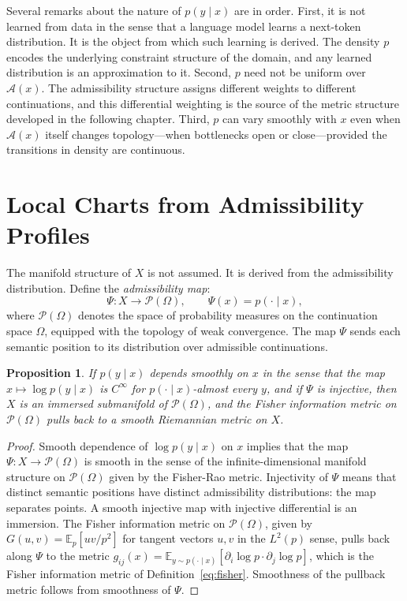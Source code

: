 \documentclass[12pt, oneside]{book}
\theoremstyle{plain-flyxion}
\newtheorem{proposition}[theorem]{Proposition}
\theoremstyle{definition-flyxion}
\newcommand{\A}{\mathcal{A}}
\begin{document}
Several remarks about the nature of $p(y\mid x)$ are in order. First, it is not learned
from data in the sense that a language model learns a next-token distribution. It is the
object from which such learning is derived. The density $p$ encodes the underlying
constraint structure of the domain, and any learned distribution is an approximation to
it. Second, $p$ need not be uniform over $\A(x)$. The admissibility structure assigns
different weights to different continuations, and this differential weighting is the
source of the metric structure developed in the following chapter. Third, $p$ can vary
smoothly with $x$ even when $\A(x)$ itself changes topology---when bottlenecks open or
close---provided the transitions in density are continuous.

\section{Local Charts from Admissibility Profiles}

The manifold structure of $X$ is not assumed. It is derived from the admissibility
distribution. Define the \emph{admissibility map}:
\[
\Psi : X \to \mathcal{P}(\Omega),
\qquad
\Psi(x) = p(\cdot \mid x),
\]
where $\mathcal{P}(\Omega)$ denotes the space of probability measures on the continuation
space $\Omega$, equipped with the topology of weak convergence. The map $\Psi$ sends
each semantic position to its distribution over admissible continuations.

\begin{proposition}\label{prop:immersion}
If $p(y \mid x)$ depends smoothly on $x$ in the sense that the map $x \mapsto
\log p(y \mid x)$ is $C^\infty$ for $p(\cdot\mid x)$-almost every $y$, and if $\Psi$ is
injective, then $X$ is an immersed submanifold of $\mathcal{P}(\Omega)$, and the Fisher
information metric on $\mathcal{P}(\Omega)$ pulls back to a smooth Riemannian metric on
$X$.
\end{proposition}

\begin{proof}
Smooth dependence of $\log p(y \mid x)$ on $x$ implies that the map $\Psi: X \to
\mathcal{P}(\Omega)$ is smooth in the sense of the infinite-dimensional manifold
structure on $\mathcal{P}(\Omega)$ given by the Fisher-Rao metric. Injectivity of $\Psi$
means that distinct semantic positions have distinct admissibility distributions: the map
separates points. A smooth injective map with injective differential is an immersion.
The Fisher information metric on $\mathcal{P}(\Omega)$, given by
$G(u,v) = \mathbb{E}_{p}[uv/p^2]$ for tangent vectors $u,v$ in the $L^2(p)$ sense,
pulls back along $\Psi$ to the metric $g_{ij}(x) = \mathbb{E}_{y \sim p(\cdot \mid
x)}[\partial_i \log p \cdot \partial_j \log p]$, which is the Fisher information metric
of Definition~\eqref{eq:fisher}. Smoothness of the pullback metric follows from smoothness
of $\Psi$.
\end{proof}
\end{document}
